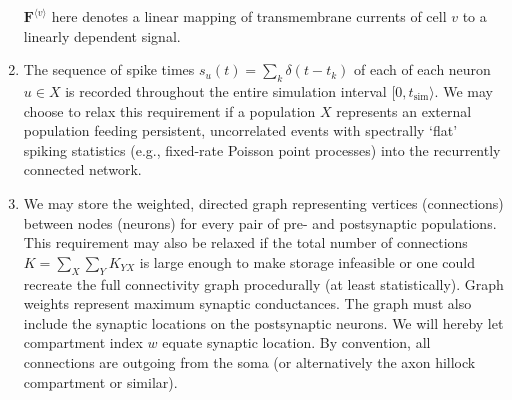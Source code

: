 \begin{enumerate}
$\mathbf{F}^{\langle v \rangle}$ here denotes a linear mapping of transmembrane currents of cell $v$ to a linearly dependent signal.
\item The sequence of spike times $s_u(t) = \sum_k \delta (t - t_k)$ of each of each neuron $u \in X$ is recorded throughout the entire simulation interval $[0, t_\text{sim} \rangle$.
We may choose to relax this requirement if a population $X$ represents an external population feeding persistent, uncorrelated events with spectrally `flat' spiking statistics (e.g., fixed-rate Poisson point processes) into the recurrently connected network. 
\item We may store the weighted, directed graph representing vertices (connections) between nodes (neurons) for every pair of pre- and postsynaptic populations.
This requirement may also be relaxed if the total number of connections $K = \sum_X \sum_Y K_{YX}$ is large enough to make storage infeasible or one could recreate the full connectivity graph procedurally (at least statistically).
Graph weights represent maximum synaptic conductances.
The graph must also include the synaptic locations on the postsynaptic neurons. 
We will hereby let compartment index $w$ equate synaptic location.
By convention, all connections are outgoing from the soma (or alternatively the axon hillock compartment or similar). 
\end{enumerate}


